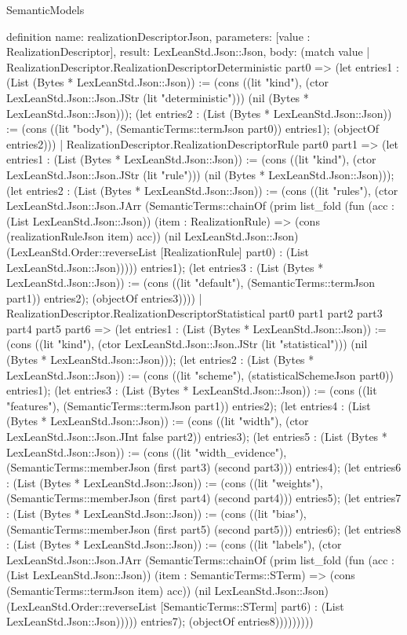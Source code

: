 \begin{lexlean}{SemanticModels}
\begin{semanticmodule}
definition{
  name: realizationDescriptorJson,
  parameters: [value : RealizationDescriptor],
  result: LexLeanStd.Json::Json,
  body: (match value
    | RealizationDescriptor.RealizationDescriptorDeterministic part0 => (let entries1 : (List (Bytes * LexLeanStd.Json::Json)) := (cons ((lit "kind"), (ctor LexLeanStd.Json::Json.JStr (lit "deterministic"))) (nil (Bytes * LexLeanStd.Json::Json))); (let entries2 : (List (Bytes * LexLeanStd.Json::Json)) := (cons ((lit "body"), (SemanticTerms::termJson part0)) entries1); (objectOf entries2)))
    | RealizationDescriptor.RealizationDescriptorRule part0 part1 => (let entries1 : (List (Bytes * LexLeanStd.Json::Json)) := (cons ((lit "kind"), (ctor LexLeanStd.Json::Json.JStr (lit "rule"))) (nil (Bytes * LexLeanStd.Json::Json))); (let entries2 : (List (Bytes * LexLeanStd.Json::Json)) := (cons ((lit "rules"), (ctor LexLeanStd.Json::Json.JArr (SemanticTerms::chainOf (prim list_fold (fun (acc : (List LexLeanStd.Json::Json)) (item : RealizationRule) => (cons (realizationRuleJson item) acc)) (nil LexLeanStd.Json::Json) (LexLeanStd.Order::reverseList [RealizationRule] part0) : (List LexLeanStd.Json::Json))))) entries1); (let entries3 : (List (Bytes * LexLeanStd.Json::Json)) := (cons ((lit "default"), (SemanticTerms::termJson part1)) entries2); (objectOf entries3))))
    | RealizationDescriptor.RealizationDescriptorStatistical part0 part1 part2 part3 part4 part5 part6 => (let entries1 : (List (Bytes * LexLeanStd.Json::Json)) := (cons ((lit "kind"), (ctor LexLeanStd.Json::Json.JStr (lit "statistical"))) (nil (Bytes * LexLeanStd.Json::Json))); (let entries2 : (List (Bytes * LexLeanStd.Json::Json)) := (cons ((lit "scheme"), (statisticalSchemeJson part0)) entries1); (let entries3 : (List (Bytes * LexLeanStd.Json::Json)) := (cons ((lit "features"), (SemanticTerms::termJson part1)) entries2); (let entries4 : (List (Bytes * LexLeanStd.Json::Json)) := (cons ((lit "width"), (ctor LexLeanStd.Json::Json.JInt false part2)) entries3); (let entries5 : (List (Bytes * LexLeanStd.Json::Json)) := (cons ((lit "width_evidence"), (SemanticTerms::memberJson (first part3) (second part3))) entries4); (let entries6 : (List (Bytes * LexLeanStd.Json::Json)) := (cons ((lit "weights"), (SemanticTerms::memberJson (first part4) (second part4))) entries5); (let entries7 : (List (Bytes * LexLeanStd.Json::Json)) := (cons ((lit "bias"), (SemanticTerms::memberJson (first part5) (second part5))) entries6); (let entries8 : (List (Bytes * LexLeanStd.Json::Json)) := (cons ((lit "labels"), (ctor LexLeanStd.Json::Json.JArr (SemanticTerms::chainOf (prim list_fold (fun (acc : (List LexLeanStd.Json::Json)) (item : SemanticTerms::STerm) => (cons (SemanticTerms::termJson item) acc)) (nil LexLeanStd.Json::Json) (LexLeanStd.Order::reverseList [SemanticTerms::STerm] part6) : (List LexLeanStd.Json::Json))))) entries7); (objectOf entries8)))))))))
}
\end{semanticmodule}
\end{lexlean}
